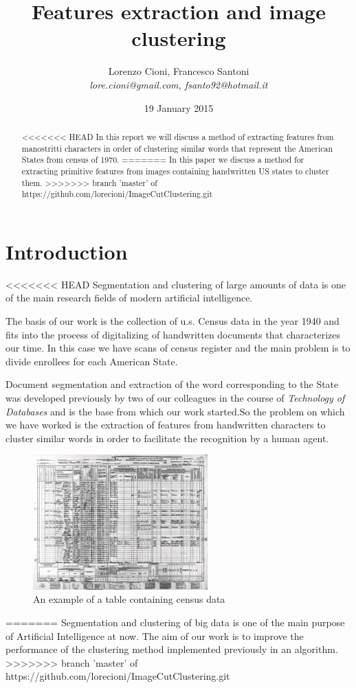 \documentclass[a4paper,12pt]{article}
\title{\bf Features extraction and image clustering}
\date {19 January 2015}
\author{Lorenzo Cioni, Francesco Santoni\\\textit{{\small lore.cioni@gmail.com, fsanto92@hotmail.it}}}
\begin{document}
\maketitle

\begin{abstract}
<<<<<<< HEAD
In this report we will discuss a method of extracting features from manostritti characters in order of clustering similar words that represent the American States from census of 1970.
=======
In this paper we discuss a method for extracting primitive features from images containing handwritten US states to cluster them.
>>>>>>> branch 'master' of https://github.com/lorecioni/ImageCutClustering.git
\end{abstract}

\tableofcontents

\section{Introduction}
<<<<<<< HEAD
Segmentation and clustering of large amounts of data is one of the main research fields of modern artificial intelligence.

The basis of our work is the collection of u.s. Census data in the year 1940 and fits into the process of digitalizing of handwritten documents that characterizes our time. In this case we have scans of census register and the main problem is to divide enrollees for each American State.

Document segmentation and extraction of the word corresponding to the State was developed previously by two of our colleagues in the course of \emph{Technology of Databases} and is the base from which our work started.So the problem on which we have worked is the extraction of features from handwritten characters to cluster similar words in order to facilitate the recognition by a human agent.

\begin{figure}[!ht]
\centering
\includegraphics[width=0.6\textwidth]{images/img1.jpg}
\caption{An example of a table containing census data}
\end{figure}
=======
Segmentation and clustering of big data is one of the main purpose of Artificial Intelligence at now. 
The aim of our work is to improve the performance of the clustering method implemented previously in an algorithm.
>>>>>>> branch 'master' of https://github.com/lorecioni/ImageCutClustering.git
\end{document}
